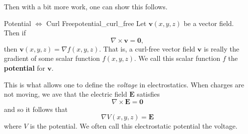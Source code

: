         Then with a bit more work, one can show this follows.
       
       	\begin{thm}{Potential $\iff$ Curl Free}{potential_curl_free}
        Let $\mathbf{v}(x,y,z)$ be a vector field.  Then if 
        \[
        \nabla \times \mathbf{v} = \mathbf{0},
        \]
        then $\mathbf{v}(x,y,z) = \nabla f(x,y,z)$.  That is, a curl-free vector field $\mathbf{v}$ is really the gradient of some scalar function $f(x,y,z)$.  We call this scalar function $f$ the \textbf{potential} for $\mathbf{v}$.
        \end{thm}
        
        This is what allows one to define the \emph{voltage} in electrostatics.  When charges are not moving, we ave that the electric field $\mathbf{E}$ satisfies
        \[
        \nabla \times \mathbf{E} = \mathbf{0}
        \]
        and so it follows that
        \[
        \nabla V(x,y,z) = \mathbf{E}
        \]
        where $V$ is the potential.  We often call this electrostatic potential the voltage.